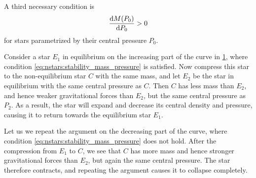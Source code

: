 \begin{figure}
\centering
{}
\caption{\label{fig:nstars:stability_mass_pressure}}
\end{figure}

A third necessary condition is
\begin{equation}
	\odv{M(P_0)}{P_0} > 0
\label{eq:nstars:stability_mass_pressure}
\end{equation}
for stars parametrized by their central pressure $P_0$.

Consider a star $E_1$ in equilibrium on the increasing part of the curve in \cref{fig:nstars:stability_mass_pressure}, where condition \eqref{eq:nstars:stability_mass_pressure} is satisfied.
Now compress this star to the non-equilibrium star $C$ with the same mass, and let $E_2$ be the star in equilibrium with the same central pressure as $C$.
Then $C$ has less mass than $E_2$, and hence weaker gravitational forces than $E_2$, but the same central pressure as $P_2$.
As a result, the star will expand and decrease its central density and pressure, causing it to return towards the equilibrium star $E_1$.

Let us we repeat the argument on the decreasing part of the curve, where condition \eqref{eq:nstars:stability_mass_pressure} does not hold.
After the compression from $E_1$ to $C$, we see that $C$ has more mass and hence stronger gravitational forces than $E_2$, but again the same central pressure.
The star therefore contracts, and repeating the argument causes it to collapse completely.

